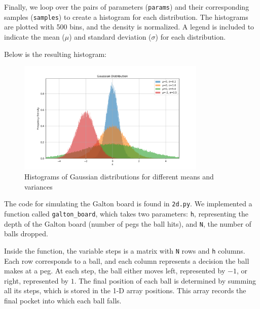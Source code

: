 \begin{solution}
	Finally, we loop over the pairs of parameters (\texttt{params}) and their corresponding samples (\texttt{samples}) to create a histogram for each distribution. The histograms are plotted with 500 bins, and the density is normalized. A legend is included to indicate the mean (\texttt{$\mu$}) and standard deviation (\texttt{$\sigma$}) for each distribution.

	Below is the resulting histogram:
	\begin{figure}[H]
		\centering
		\includegraphics[width=0.8\textwidth]{../images/2c.png}
		\caption{Histograms of Gaussian distributions for different means and variances}
		\label{fig:gaussian_hist}
	\end{figure}
	
	The code for simulating the Galton board is found in \texttt{2d.py}. We implemented a function called \texttt{galton\_board}, which takes two parameters: \texttt{h}, representing the depth of the Galton board (number of pegs the ball hits), and \texttt{N}, the number of balls dropped.

Inside the function, the variable steps is a matrix with \texttt{N} rows and \texttt{h} columns. Each row corresponds to a ball, and each column represents a decision the ball makes at a peg. At each step, the ball either moves left, represented by $-1$, or right, represented by $1$. The final position of each ball is determined by summing all its steps, which is stored in the 1-D array positions. This array records the final pocket into which each ball falls.


\end{solution}
